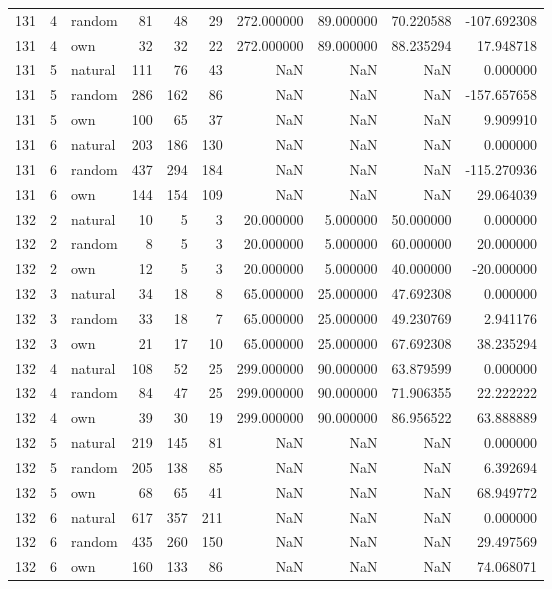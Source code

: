 \begin{table}[htbp]
\begin{tabular}{rrlrrrrrrr}
131 & 4 & random & 81 & 48 & 29 & 272.000000 & 89.000000 & 70.220588 & -107.692308 \\
131 & 4 & own & 32 & 32 & 22 & 272.000000 & 89.000000 & 88.235294 & 17.948718 \\
131 & 5 & natural & 111 & 76 & 43 & NaN & NaN & NaN & 0.000000 \\
131 & 5 & random & 286 & 162 & 86 & NaN & NaN & NaN & -157.657658 \\
131 & 5 & own & 100 & 65 & 37 & NaN & NaN & NaN & 9.909910 \\
131 & 6 & natural & 203 & 186 & 130 & NaN & NaN & NaN & 0.000000 \\
131 & 6 & random & 437 & 294 & 184 & NaN & NaN & NaN & -115.270936 \\
131 & 6 & own & 144 & 154 & 109 & NaN & NaN & NaN & 29.064039 \\
132 & 2 & natural & 10 & 5 & 3 & 20.000000 & 5.000000 & 50.000000 & 0.000000 \\
132 & 2 & random & 8 & 5 & 3 & 20.000000 & 5.000000 & 60.000000 & 20.000000 \\
132 & 2 & own & 12 & 5 & 3 & 20.000000 & 5.000000 & 40.000000 & -20.000000 \\
132 & 3 & natural & 34 & 18 & 8 & 65.000000 & 25.000000 & 47.692308 & 0.000000 \\
132 & 3 & random & 33 & 18 & 7 & 65.000000 & 25.000000 & 49.230769 & 2.941176 \\
132 & 3 & own & 21 & 17 & 10 & 65.000000 & 25.000000 & 67.692308 & 38.235294 \\
132 & 4 & natural & 108 & 52 & 25 & 299.000000 & 90.000000 & 63.879599 & 0.000000 \\
132 & 4 & random & 84 & 47 & 25 & 299.000000 & 90.000000 & 71.906355 & 22.222222 \\
132 & 4 & own & 39 & 30 & 19 & 299.000000 & 90.000000 & 86.956522 & 63.888889 \\
132 & 5 & natural & 219 & 145 & 81 & NaN & NaN & NaN & 0.000000 \\
132 & 5 & random & 205 & 138 & 85 & NaN & NaN & NaN & 6.392694 \\
132 & 5 & own & 68 & 65 & 41 & NaN & NaN & NaN & 68.949772 \\
132 & 6 & natural & 617 & 357 & 211 & NaN & NaN & NaN & 0.000000 \\
132 & 6 & random & 435 & 260 & 150 & NaN & NaN & NaN & 29.497569 \\
132 & 6 & own & 160 & 133 & 86 & NaN & NaN & NaN & 74.068071 \\

\end{tabular}
\end{table}
